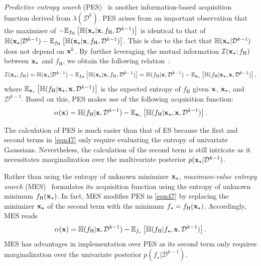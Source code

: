 \documentclass[journal ]{new-aiaa}
\begin{document}
	\textit{Predictive entropy search} (PES)~\citep{HernandezLobato2014} is another information-based acquisition function derived from $\lambda(\mathcal{D}^{k})$.
	PES arises from an important observation that the maximizer of $-\mathbb{E}_{f_\text{H}}\left[\mathbb{H}({\bf x}_\star|{\bf x},f_\text{H},\mathcal{D}^{k-1})\right]$ is identical to that of $\mathbb{H}({\bf x}_\star|\mathcal{D}^{k-1})-\mathbb{E}_{f_\text{H}}\left[\mathbb{H}({\bf x}_\star|{\bf x},f_\text{H},\mathcal{D}^{k-1})\right]$.
	This is due to the fact that $\mathbb{H}({\bf x}_\star|\mathcal{D}^{k-1})$ does not depend on ${\bf x}^k$.
	By further leveraging the mutual information $\mathcal{I}({\bf x}_\star;f_\text{H})$ between ${\bf x}_\star$ and $f_\text{H}$, we obtain the following relation~\citep{Houlsby2012}:
	\begin{equation}\label{eqn46}
		\mathcal{I}({\bf x}_\star;f_\text{H})
		= \mathbb{H}({\bf x}_\star|\mathcal{D}^{k-1})-\mathbb{E}_{f_\text{H}}\left[\mathbb{H}({\bf x}_\star|{\bf x},f_\text{H},\mathcal{D}^{k-1})\right]
		= \mathbb{H}(f_\text{H}|{\bf x},\mathcal{D}^{k-1})-\mathbb{E}_{{\bf x}_\star}\left[\mathbb{H}(f_\text{H}|{\bf x}_\star,{\bf x},\mathcal{D}^{k-1})\right],
	\end{equation}
	where $\mathbb{E}_{{\bf x}_\star}\left[\mathbb{H}(f_\text{H}|{\bf x}_\star,{\bf x},\mathcal{D}^{k-1})\right]$ is the expected entropy of $f_\text{H}$ given ${\bf x}$, ${\bf x}_\star$, and $\mathcal{D}^{k-1}$.
	Based on this, PES makes use of the following acquisition function:
	\begin{equation}\label{eqn47}
		\alpha({\bf x}) 
		= \mathbb{H}(f_\text{H}|{\bf x},\mathcal{D}^{k-1})-\mathbb{E}_{{\bf x}_\star}\left[\mathbb{H}(f_\text{H}|{\bf x}_\star,{\bf x},\mathcal{D}^{k-1})\right].
	\end{equation}
	
	The calculation of PES is much easier than that of ES because the first and second terms in \cref{eqn47} only require evaluating the entropy of univariate Gaussians.
	Nevertheless, the calculation of the second term is still intricate as it necessitates marginalization over the multivariate posterior $p({\bf x}_\star|\mathcal{D}^{k-1})$.
	
	Rather than using the entropy of unknown minimizer ${\bf x}_\star$, \textit{maximum-value entropy search} (MES)~\citep{WangZ2017} formulates its acquisition function using the entropy of unknown minimum $f_\text{H}({\bf x}_\star)$.
	In fact, MES modifies PES in \cref{eqn47} by replacing the minimizer ${\bf x}_\star$ of the second term with the minimum $f_\star = f_\text{H}({\bf x}_\star)$.
	Accordingly, MES reads
	\begin{equation}\label{eqn48}
		\alpha({\bf x})
		= \mathbb{H}(f_\text{H}|{\bf x},\mathcal{D}^{k-1})-\mathbb{E}_{f_\star }\left[\mathbb{H}(f_\text{H}|f_\star ,{\bf x},\mathcal{D}^{k-1})\right].
	\end{equation}
	MES has advantages
	in implementation over PES as its second term only requires marginalization over the univariate posterior $p(f_\star|\mathcal{D}^{k-1})$.
	
\end{document}
